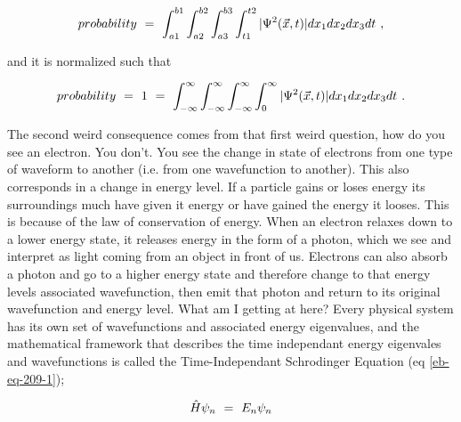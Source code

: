 \documentclass{article}
\begin{document}
\begin{equation} \label{eb-eq-207-1}
probability \hspace{0.125cm} = \hspace{0.125cm} \int_{a1}^{b1}\int_{a2}^{b2}\int_{a3}^{b3}\int_{t1}^{t2} |\Psi^2(\vec{x},t)| dx_{1}dx_{2}dx_{3}dt \hspace{0.125cm} , 
\end{equation}

and it is normalized such that

\begin{equation} \label{eb-eq-208-1}
probability \hspace{0.125cm} = \hspace{0.125cm} 1 \hspace{0.125cm} = \hspace{0.125cm} \int_{-\infty}^{\infty}\int_{-\infty}^{\infty}\int_{-\infty}^{\infty}\int_{0}^{\infty} |\Psi^2(\vec{x},t)| dx_{1}dx_{2}dx_{3}dt \hspace{0.125cm} .
\end{equation}

The second weird consequence comes from that first weird question, how do you see an electron. You don't. You see the change in state of electrons from one type of waveform to another (i.e. from one wavefunction to another). This also corresponds in a change in energy level. If a particle gains or loses energy its surroundings much have given it energy or have gained the energy it looses. This is because of the law of conservation of energy. When an electron relaxes down to a lower energy state, it releases energy in the form of a photon, which we see and interpret as light coming from an object in front of us. Electrons can also absorb a photon and go to a higher energy state and therefore change to that energy levels associated wavefunction, then emit that photon and return to its original wavefunction and energy level. What am I getting at here? Every physical system has its own set of wavefunctions and associated energy eigenvalues, and the mathematical framework that describes the time independant energy eigenvales and wavefunctions is called the Time-Independant Schrodinger Equation (eq \ref{eb-eq-209-1});

\begin{equation} \label{eb-eq-209-1}
\hat{H}\psi_n \hspace{0.125cm} = \hspace{0.125cm} E_n\psi_n
\end{equation}
\end{document}
